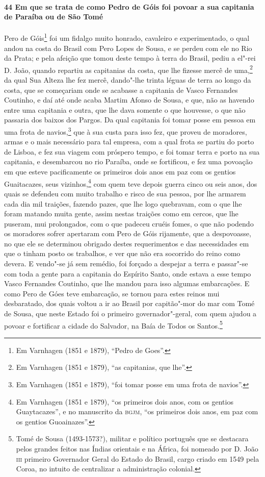 \begin{linenumbers}
\paragraph{44 Em que se trata de como Pedro de Góis foi povoar a sua capitania de Paraíba
ou de São Tomé} \quad
Pero de Góis\footnote{ Em Varnhagen (1851 e 1879), ``Pedro de Goes''.} foi um fidalgo
muito honrado, cavaleiro e experimentado, o qual andou na costa do Brasil com Pero Lopes
de Sousa, e se perdeu com ele no Rio da Prata; e pela afeição que tomou deste tempo à
terra do Brasil, pediu a el"-rei D. João, quando repartiu as capitanias da costa, que lhe
fizesse mercê de uma,\footnote{ Em Varnhagen (1851 e 1879), ``as capitanias, que lhe''.}
da qual Sua Alteza lhe fez mercê, dando"-lhe trinta léguas de terra ao longo da costa, que
se começariam onde se acabasse a capitania de Vasco Fernandes Coutinho, e daí até onde
acaba Martim Afonso de Sousa, e que, não as havendo entre uma capitania e outra, que lhe
dava somente o que houvesse, o que não passaria dos baixos dos Pargos. Da qual capitania
foi tomar posse em pessoa em uma frota de navios,\footnote{ Em Varnhagen (1851 e 1879),
``foi tomar posse em uma frota de navios''.} que à sua custa para isso fez, que proveu de
moradores, armas e o mais necessário para tal empresa, com a qual frota se partiu do porto
de Lisboa, e fez sua viagem com próspero tempo, e foi tomar terra e porto na sua
capitania, e desembarcou no rio Paraíba, onde se fortificou, e fez uma povoação em que
esteve pacificamente os primeiros dois anos em paz com os gentios Guaitacazes, seus
vizinhos,\footnote{ Em Varnhagen (1851 e 1879), ``os primeiros dois anos, com os gentios
Guaytacazes'', e no manuscrito da \textsc{bgjm}, ``os primeiros dois anos, em paz com os
gentios Guoainazes''.} com quem teve depois guerra cinco ou seis anos, dos quais se
defendeu com muito trabalho e risco de sua pessoa, por lhe armarem cada dia mil traições,
fazendo pazes, que lhe logo quebravam, com o que lhe foram matando muita gente, assim
nestas traições como em cercos, que lhe puseram, mui prolongados, com o que padeceu cruéis
fomes, o que não podendo os moradores sofrer apertaram com Pero de Góis rijamente, que a
despovoasse, no que ele se determinou obrigado destes requerimentos e das necessidades em
que o tinham posto os trabalhos, e ver que não era socorrido do reino como devera. E
vendo"-se já sem remédio, foi forçado a despejar a terra e passar"-se com toda a gente para
a capitania do Espírito Santo, onde estava a esse tempo Vasco Fernandes Coutinho, que lhe
mandou para isso algumas embarcações. E como Pero de Góes teve embarcação, se tornou para
estes reinos mui desbaratado, dos quais voltou a ir ao Brasil por capitão"-mor do mar com
Tomé de Sousa, que neste Estado foi o primeiro governador"-geral, com quem ajudou a povoar
e fortificar a cidade do Salvador, na Baía de Todos os Santos.\footnote{ Tomé de Sousa
(1493-1573?), militar e político português que se destacara pelos grandes feitos nas
Índias orientais e na África, foi nomeado por D. João \textsc{iii} primeiro Governador
Geral do Estado do Brasil, cargo criado em 1549 pela Coroa, no intuito de centralizar a
administração colonial.}


\end{linenumbers}
